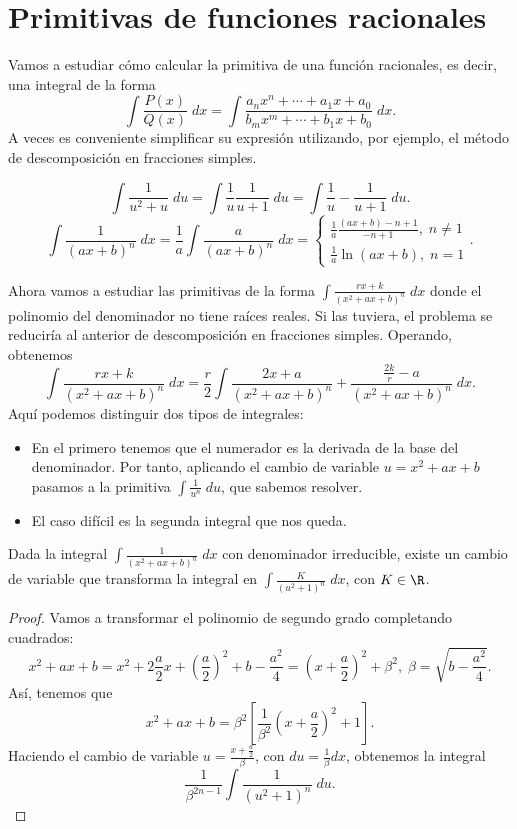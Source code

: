 \section{Primitivas de funciones racionales}
Vamos a estudiar cómo calcular la primitiva de una función racionales, es decir, una integral de la forma
\[\int \frac{P\left(x\right)}{Q\left(x\right)} \; dx = \int \frac{a_{n}x^{n} + \cdots + a_{1}x + a_{0}}{b_{m}x^{m}+\cdots + b_{1}x + b_{0}} \; dx .\]
A veces es conveniente simplificar su expresión utilizando, por ejemplo, el método de descomposición en fracciones simples. 
\begin{eg}
\normalfont 
\[\int \frac{1}{u^{2}+u} \; du = \int \frac{1}{u}\frac{1}{u+1} \; du = \int \frac{1}{u}-\frac{1}{u+1} \; du .\]
\[\int \frac{1}{\left(ax+b\right)^{n}} \; dx = \frac{1}{a} \int \frac{a}{\left(ax+b\right)^{n}} \; dx = 
\begin{cases}
\frac{1}{a}\frac{\left(ax+b\right)-n+1}{-n+1}, \; n \neq 1 \\
\frac{1}{a}\ln \left(ax+b\right), \; n = 1
\end{cases}
.\]
\end{eg}
Ahora vamos a estudiar las primitivas de la forma $\displaystyle \int \frac{rx+k}{\left(x^{2}+ax+b\right)^{n}} \; dx $ donde el polinomio del denominador no tiene raíces reales. Si las tuviera, el problema se reduciría al anterior de descomposición en fracciones simples. Operando, obtenemos 
\[\int \frac{rx+k}{\left(x^{2}+ax+b\right)^{n}} \; dx = \frac{r}{2}\int \frac{2x+a}{\left(x^{2}+ax+b\right)^{n}} + \frac{\frac{2k}{r}-a}{\left(x^{2}+ax+b\right)^{n}} \; dx .\]
Aquí podemos distinguir dos tipos de integrales:
\begin{itemize}
\item En el primero tenemos que el numerador es la derivada de la base del denominador. Por tanto, aplicando el cambio de variable $\displaystyle u = x^{2} + ax + b $ pasamos a la primitiva $\displaystyle \int \frac{1}{u^{n}} \; du $, que sabemos resolver.
\item El caso difícil es la segunda integral que nos queda.
\end{itemize}
\begin{flema}[]
\normalfont Dada la integral $\displaystyle \int \frac{1}{\left(x^{2}+ax+b\right)^{n}} \; dx $ con denominador irreducible, existe un cambio de variable que transforma la integral en $\displaystyle \int \frac{K}{\left(u^{2}+1\right)^{n}} \; dx $, con $\displaystyle K \in \R $.
\end{flema}
\begin{proof}
Vamos a transformar el polinomio de segundo grado completando cuadrados:
\[ x^{2} + ax + b=x^{2}+2\frac{a}{2}x + \left(\frac{a}{2}\right)^{2}+b-\frac{a^{2}}{4} = \left(x+\frac{a}{2}\right)^{2}+\beta^{2}, \; \beta = \sqrt{b - \frac{a^{2}}{4}} .\]
Así, tenemos que 
\[x^{2}+ax+b = \beta^{2}\left[\frac{1}{\beta^{2}}\left(x+\frac{a}{2}\right)^{2}+1\right] .\]
Haciendo el cambio de variable $\displaystyle u = \frac{x + \frac{a}{2}}{\beta } $, con $\displaystyle du = \frac{1}{\beta }dx $, obtenemos la integral
\[ \frac{1}{\beta^{2n-1}}\int \frac{1}{\left(u^{2}+1\right)^{n}} \; du.\]
\end{proof}
